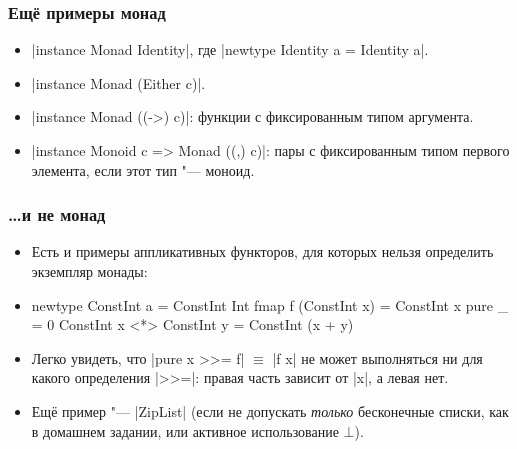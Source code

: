 \documentclass[11pt]{beamer}
\begin{document}
\begin{frame}[fragile]
  \frametitle{Ещё примеры монад}
  \begin{itemize}
    \item \haskinline|instance Monad Identity|, где \haskinline|newtype Identity a = Identity a|.
    \item \haskinline|instance Monad (Either c)|.
    \item \haskinline|instance Monad ((->) c)|: функции с фиксированным типом аргумента.
    \item \haskinline|instance Monoid c => Monad ((,) c)|: пары с фиксированным типом первого элемента, если этот тип "--- моноид.
  \end{itemize}
\end{frame}

\begin{frame}[fragile]
  \frametitle{\ldots и не монад}
  \begin{itemize}
    \item Есть и примеры аппликативных функторов, для которых нельзя определить экземпляр монады:
    \item
          \begin{haskell}
            newtype ConstInt a = ConstInt Int
            fmap f (ConstInt x) = ConstInt x
            pure _ = 0
            ConstInt x <*> ConstInt y = ConstInt (x + y)
          \end{haskell}
    \item Легко увидеть, что \haskinline|pure x >>= f| $\equiv$ \haskinline|f x| не может выполняться ни для какого определения \haskinline|>>=|: правая часть зависит от \haskinline|x|, а левая нет.
          \pause
    \item Ещё пример "--- \haskinline|ZipList| (если не допускать \emph{только} бесконечные списки, как в домашнем задании, или активное использование $\bot$).
  \end{itemize}
\end{frame}
\end{document}
